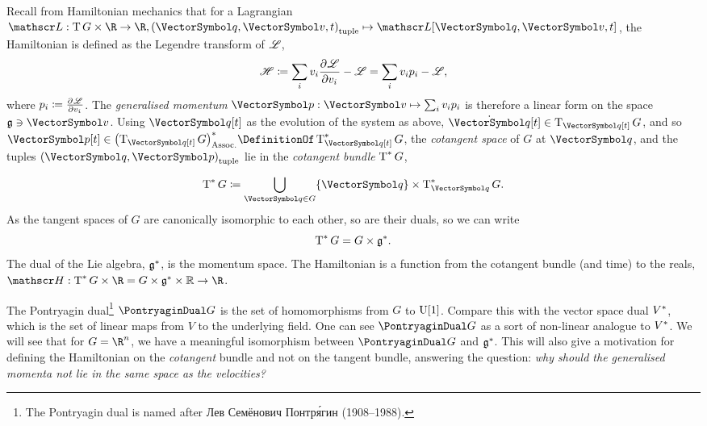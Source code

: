 \documentclass[10pt, a4paper, twoside]{lecturenotes}
\newcommand{\Rn}{{\R^n}}
\begin{document}
\begin{supplemental}
Recall from Hamiltonian mechanics that for a Lagrangian
$\FunctionSpec \Lagrangian {\TangentBundle G \Cartesian \R}{\R}, \FunctionBody {\tuple{\vq,\vv,t}} {\Lagrangian\of{\vq,\vv,t}}$,
the Hamiltonian is defined as the Legendre transform of $\mathscr{L}$,
\begin{equation*}
\Hamiltonian \DefineAs \sum i v_i \pderiv{v_i}\Lagrangian - \Lagrangian = \sum i v_i p_i - \Lagrangian\text{,}
\end{equation*}
where $p_i \coloneq \frac{\partial^{} \mathscr{L}}{{\partial {v_i}}^{}}$. The \emph{generalised momentum} $\FunctionNamedBody\vp \vv {\sum i v_i p_i}$ is therefore a linear form on the space $\VelocitySpace\owns\vv$. Using $\vq\of t$ as the evolution of the system as above, $\TimeDerivative\vq\of t \in \TangentSpace{\vq\of t}G$, and so $\vp\of t\in \Dual{\pa{\TangentSpace{\vq\of t}G}} \DefinitionOf \CotangentSpace{\vq\of t}G$, the \emph{cotangent space} of $G$ at $\vq$, and the tuples $\tuple{\vq,\vp}$ lie in the \emph{cotangent bundle} $\operatorname{T}^*{G}$,
\begin{equation*}
\CotangentBundle G \DefineAs \UnionOver{\vq\in G}\set\vq \Cartesian \CotangentSpace\vq G\text{.}
\end{equation*}
As the tangent spaces of $G$ are canonically isomorphic to each other, so are their duals, so we can write
\begin{equation*}
\operatorname{T}^*{G} = G \times \mathfrak{g}^*\text{.}
\end{equation*}
The dual of the Lie algebra, $\mathfrak{g}^*$, is the momentum space. The Hamiltonian is a function from the cotangent bundle (and time) to the reals, $\FunctionSpec\Hamiltonian {\CotangentBundle G \Cartesian \R = G \Cartesian \MomentumSpace \Cartesian \Reals} \R$.

The Pontryagin dual\footnote{The Pontryagin dual is named after %
\textrussian{Лев Семёнович Понтря́гин} (1908--1988).} $\PontryaginDual G$ is the set of homomorphisms from $G$ to $\UnitaryGroup\of 1$. Compare this with the vector space dual $V^*$, which is the set of linear maps from $V$ to the underlying field. One can see $\PontryaginDual G$ as a sort of non-linear analogue to $V^*$. We will see that for $G=\Rn$, we have a meaningful isomorphism between $\PontryaginDual G$ and $\mathfrak{g}^*$. This will also give a motivation for defining the Hamiltonian on the \emph{cotangent} bundle and not on the tangent bundle, answering the question: \emph{why should the generalised momenta not lie in the same space as the velocities?}
\endgroup
\end{supplemental}
\end{document}
